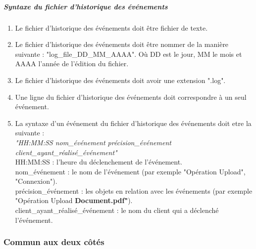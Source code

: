 \documentclass[10pt,a4paper]{report}
\begin{document}
		\subparagraph{Syntaxe du fichier d'historique des événements}
			\begin{enumerate}
				\item Le fichier d'historique des événements doit être fichier de texte.
				
				\item Le fichier d'historique des événements doit être nommer de la manière suivante : "log\_file\_DD\_MM\_AAAA". Où DD est le jour, MM le mois et AAAA l'année de l'édition du fichier.
				
				\item Le fichier d'historique des événements doit avoir une extension ".log".
				\item Une ligne du fichier d'historique des événements doit correspondre à un seul événement.
				
				\item La syntaxe d'un événement du fichier d'historique des événements doit etre la suivante : \\
		\textit{"HH:MM:SS nom\_événement précision\_événement client\_ayant\_réalisé\_événement"}\\
		HH:MM:SS :  l'heure du déclenchement de l'événement.\\
		nom\_événement : le nom de l'événement (par exemple "Opération Upload", "Connexion").\\
		précision\_événement : les objets en relation avec les événements (par exemple "Opération Upload \textbf{Document.pdf"}).\\
		client\_ayant\_réalisé\_événement : le nom du client qui a déclenché l'événement.\\		
	\end{enumerate}

\subsubsection{Commun aux deux côtés}
\end{document}
